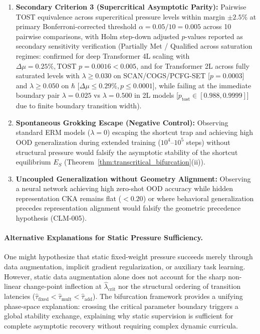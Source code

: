 \documentclass{article}
\theoremstyle{plain}
\theoremstyle{definition}
\begin{document}
\begin{enumerate}[leftmargin=*,noitemsep]
    \item \textbf{Secondary Criterion 3 (Supercritical Asymptotic Parity):} Pairwise TOST equivalence across supercritical pressure levels within margin $\pm 2.5\%$ at primary Bonferroni-corrected threshold $\alpha = 0.05 / 10 = 0.005$ across 10 pairwise comparisons, with Holm step-down adjusted $p$-values reported as secondary sensitivity verification (Partially Met / Qualified across saturation regimes: confirmed for deep Transformer 4L scaling with $\Delta\mu = 0.25\%, \text{TOST } p = 0.0016 < 0.005$, and for Transformer 2L across fully saturated levels with $\lambda \ge 0.030$ on SCAN/COGS/PCFG-SET [$p = 0.0003$] and $\lambda \ge 0.050$ on $\hbar$ [$\Delta\mu \le 0.29\%, p \le 0.0001$], while failing at the immediate boundary pair $\lambda=0.025$ vs $\lambda=0.500$ in 2L models [$p_{\text{tost}} \in [0.988, 0.9999]$] due to finite boundary transition width).
    \item \textbf{Spontaneous Grokking Escape (Negative Control):} Observing standard ERM models ($\lambda = 0$) escaping the shortcut trap and achieving high OOD generalization during extended training ($10^4$--$10^5$ steps) without structural pressure would falsify the asymptotic stability of the shortcut equilibrium $E_S$ (Theorem~\ref{thm:transcritical_bifurcation}(ii)).
    \item \textbf{Uncoupled Generalization without Geometry Alignment:} Observing a neural network achieving high zero-shot OOD accuracy while hidden representation CKA remains flat ($< 0.20$) or where behavioral generalization precedes representation alignment would falsify the geometric precedence hypothesis (CLM-005).
\end{enumerate}

\paragraph{Alternative Explanations for Static Pressure Sufficiency.}
One might hypothesize that static fixed-weight pressure succeeds merely through data augmentation, implicit gradient regularization, or auxiliary task learning. However, static data augmentation alone does not account for the sharp non-linear change-point inflection at $\hat{\lambda}_{\text{crit}}$ nor the structural ordering of transition latencies ($\hat{\tau}_{\text{fixed}} < \hat{\tau}_{\text{mult}} < \hat{\tau}_{\text{add}}$). The bifurcation framework provides a unifying phase-space explanation: crossing the critical parameter boundary triggers a global stability exchange, explaining why static supervision is sufficient for complete asymptotic recovery without requiring complex dynamic curricula.
\end{document}
